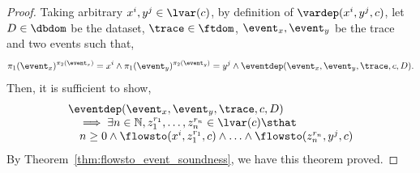 \begin{proof}
  Taking arbitrary $x^i, y^j \in \lvar(c)$,
%
%
by definition of $\vardep(x^i, y^j, {c})$, 
let $D \in \dbdom$ be the dataset,
$\trace \in \ftdom$, $\event_x, \event_y$ be the trace and two events such that,
\[\pi_1(\event_x)^{\pi_2(\event_x)} = x^i
\land 
\pi_1(\event_y)^{\pi_2(\event_y)} = y^j
\land \eventdep(\event_x, \event_y, \trace, c, D). \]  
Then, it is sufficient to show,
$$
\begin{array}{l}
  \eventdep(\event_x, \event_y, \trace, c, D) 
  \\ \quad 
  \implies 
  \exists n \in \mathbb{N}, z_1^{r_1}, \ldots, z_n^{r_n} \in \lvar(c) \sthat  
  \\ \quad 
  n \geq 0 \land
  \flowsto(x^i,  z_1^{r_1}, c) 
  \land \ldots \land \flowsto(z_n^{r_n}, y^j, c) 
\end{array}
$$
%
By Theorem~\ref{thm:flowsto_event_soundness}, we have this theorem proved.
\end{proof}